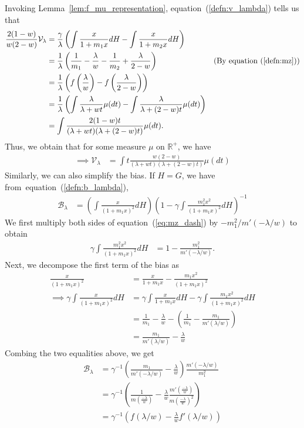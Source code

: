 \documentclass[10pt]{article}
\def\eqref#1{equation~(\ref{#1})}
\numberwithin{thm}{section}
\numberwithin{remark}{section}
\numberwithin{ex}{section}
\numberwithin{ass}{section}
\numberwithin{defn}{section}
\numberwithin{lemma}{section}
\numberwithin{corollary}{section}
\numberwithin{prop}{section}
\newcommand{\mb}{\mathcal{B}}
\numberwithin{equation}{section}
\begin{document}
Invoking Lemma~\ref{lem:f_mu_representation}, \eqref{defn:v_lambda} tells us that
\begin{align}
\frac{2(1-w)}{w(2-w)}\mathcal V_\lambda &=  \frac{\gamma}{\lambda} \left(\int \frac{x}{1+m_1 x} dH - \int \frac{x}{1+m_2 x} dH \right) \nonumber \\
&= \frac{1}{\lambda} \left( \frac{1}{m_1} - \frac{\lambda}{w} - \frac{1}{m_2} + \frac{\lambda}{2-w}\right) & (\text{By \eqref{defn:mz}})\\
&= \frac{1}{\lambda} \left(
  f\left(\frac{\lambda}{w}\right) - f\left(\frac{\lambda}{2-w}\right)
\right) \label{eq:reff_var}\\
&= \frac{1}{\lambda}\left( \int \frac{\lambda}{\lambda+wt} \mu(dt) - \int \frac{\lambda}{\lambda+(2-w)t} \mu(dt)\right) \nonumber \\
&= \int \frac{2(1-w)t}{(\lambda+wt)(\lambda+(2-w)t)} \mu(dt). \nonumber
\end{align}
Thus, we obtain that for some measure $\mu$ on $\mathbb{R}^+$, we have
\begin{align}
\label{eq:vaR_pu_int}
\implies \mathcal V_\lambda &= \int t \frac{w(2-w)}{(\lambda+wt)(\lambda+(2-w)t)} \mu(dt)
\end{align}
Similarly, we can also simplify the bias. If $H=G$, we have from~\eqref{defn:b_lambda},
\begin{align*}
\mathcal{B}_\lambda & = \left( \int \frac{x}{(1 + m_1 x)^2} dH\right)  \left(1 - \gamma \int \frac{m_1^2 x^2}{(1+m_1 x)^2} dH\right)^{-1}
\end{align*}
We first multiply both sides of \eqref{eq:mz_dash} by $-m_1^2/m'(-\lambda/w)$ to obtain
\begin{align*}
\gamma \int \frac{m_1^2 x^2}{(1+m_1 x)^2} dH &= 1 - \frac{m_1^2}{m'(-\lambda/w)}.
\end{align*}
Next, we decompose the first term of the bias as
\begin{align*}
\frac{x}{(1+m_1x)^2} &= \frac{x}{1+m_1 x} - \frac{m_1 x^2}{(1+m_1 x)^2}\\
\implies \gamma \int  \frac{x}{(1+m_1x)^2} dH &= \gamma \int \frac{x}{1+m_1 x} dH - \gamma \int \frac{m_1 x^2}{(1+m_1 x)^2} dH\\
&= \frac{1}{m_1} - \frac{\lambda}{w} - \left( \frac{1}{m_1}-\frac{m_1}{m'(\lambda/w)}\right)\\
&= \frac{m_1}{m'(\lambda/w)} - \frac{\lambda}{w}
\end{align*}
Combing the two equalities above, we get
\begin{align}
\mb_\lambda &= \gamma^{-1} \left(\frac{m_1}{m'(-\lambda/w)} - \frac{\lambda}{w}\right) \frac{m'(-\lambda/w)}{m_1^2} \nonumber \\
&= \gamma^{-1} \left(\frac{1}{m(\frac{-\lambda}{w})} - \frac{\lambda}{w} \frac{m'(\frac{-\lambda}{w})}{m(\frac{-\lambda}{w})^2}\right) \nonumber \\
&=\gamma^{-1} \left(f(\lambda/w) - \frac{\lambda}{w} f'(\lambda/w)\right)\label{eq:reff_bias}
\end{align}
\end{document}

